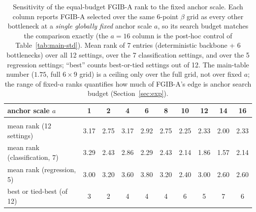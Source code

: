 \begin{table}[t]
\caption{Sensitivity of the equal-budget FGIB-A rank to the fixed anchor scale. Each column reports FGIB-A selected over the same 6-point $\beta$ grid as every other bottleneck at a \emph{single globally fixed} anchor scale $a$, so its search budget matches the comparison exactly (the $a{=}16$ column is the post-hoc control of Table~\ref{tab:main-std}). Mean rank of 7 entries (deterministic backbone + 6 bottlenecks) over all 12 settings, over the 7 classification settings, and over the 5 regression settings; ``best'' counts best-or-tied settings out of 12. The main-table number ($1.75$, full $6\times9$ grid) is a ceiling only over the full grid, not over fixed $a$; the range of fixed-$a$ ranks quantifies how much of FGIB-A's edge is anchor search budget (Section~\ref{sec:exp}).}
\label{tab:anchor-ranks}
\begin{center}\small
\begin{tabular}{lccccccccc}
anchor scale $a$ & 1 & 2 & 4 & 6 & 8 & 10 & 12 & 14 & 16 \\ \hline \\[-1.8ex]
\multicolumn{1}{l}{mean rank (12 settings)} & 3.17 & 2.75 & 3.17 & 2.92 & 2.75 & 2.25 & 2.33 & 2.00 & 2.33 \\
\multicolumn{1}{l}{mean rank (classification, 7)} & 3.29 & 2.43 & 2.86 & 2.29 & 2.43 & 2.14 & 1.86 & 1.57 & 2.14 \\
\multicolumn{1}{l}{mean rank (regression, 5)} & 3.00 & 3.20 & 3.60 & 3.80 & 3.20 & 2.40 & 3.00 & 2.60 & 2.60 \\
\multicolumn{1}{l}{best or tied-best (of 12)} & 3 & 2 & 4 & 4 & 4 & 6 & 5 & 7 & 6 \\
\end{tabular}\end{center}\end{table}
